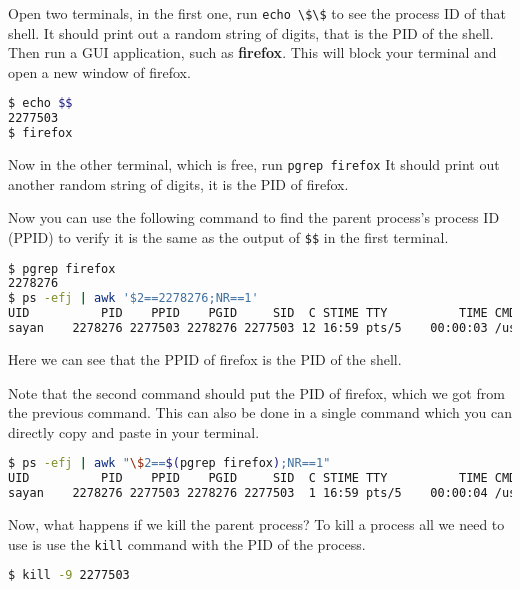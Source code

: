Open two terminals, in the first one, run \lstinline|echo \$\$| to see the
process ID of that shell.
It should print out a random string of digits, that is the PID of the shell.
Then run a GUI application, such as \textbf{firefox}.
This will block your terminal and open a new window of firefox.

\begin{lstlisting}[language=bash]
$ echo $$
2277503
$ firefox
\end{lstlisting}

Now in the other terminal, which is free, run \lstinline|pgrep firefox|
It should print out another random string of digits, it is the PID of
firefox.

Now you can use the following command to find the parent process's process
ID (PPID) to verify it is the same as the output of \lstinline|$$| in the first terminal.

\begin{lstlisting}[language=bash]
$ pgrep firefox
2278276
$ ps -efj | awk '$2==2278276;NR==1'
UID          PID    PPID    PGID     SID  C STIME TTY          TIME CMD
sayan    2278276 2277503 2278276 2277503 12 16:59 pts/5    00:00:03 /usr/lib/firefox/firefox
\end{lstlisting}

Here we can see that the PPID of firefox is the PID of the shell.

Note that the second command should put the PID of firefox, which we got
from the previous command. This can also be done in a single command
which you can directly copy and paste in your terminal.

\begin{lstlisting}[language=bash]
$ ps -efj | awk "\$2==$(pgrep firefox);NR==1"
UID          PID    PPID    PGID     SID  C STIME TTY          TIME CMD
sayan    2278276 2277503 2278276 2277503  1 16:59 pts/5    00:00:04 /usr/lib/firefox/firefox
\end{lstlisting}

Now, what happens if we kill the parent process?
To kill a process all we need to use is use the \lstinline|kill|
command with the PID of the process.

\begin{lstlisting}[language=bash]
$ kill -9 2277503
\end{lstlisting}


